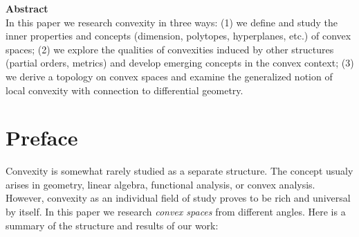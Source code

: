 \documentclass[12pt, a4paper]{article}
\begin{document}
\textbf{Abstract}\\[1mm]

In this paper we research convexity in three ways: (1) we define and study the inner properties and concepts (dimension, polytopes, hyperplanes, etc.) of convex spaces; (2) we explore the qualities of convexities induced by other structures (partial orders, metrics) and develop emerging concepts in the convex context; (3) we derive a topology on convex spaces and examine the generalized notion of local convexity with connection to differential geometry.

\newpage

\restoregeometry

\tableofcontents
\newpage

\section{Preface}

Convexity is somewhat rarely studied as a separate structure. The concept usualy arises in geometry, linear algebra, functional analysis, or convex analysis. However, convexity as an individual field of study proves to be rich and universal by itself. In this paper we research \textit{convex spaces} from different angles. Here is a summary of the structure and results of our work:
\end{document}
